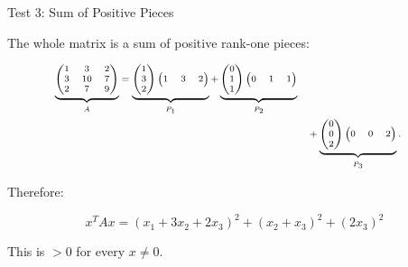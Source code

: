 \documentclass[10pt]{beamer}
\theoremstyle{definition}
\begin{document}
\begin{frame}{Test 3: Sum of Positive Pieces}

The whole matrix is a sum of positive rank-one pieces:

\[
\scriptsize
\begin{aligned}
\underbrace{
\begin{pmatrix}
1&3&2\\
3&10&7\\
2&7&9
\end{pmatrix}}_{A}
=
\underbrace{
\begin{pmatrix}1\\3\\2\end{pmatrix}
\begin{pmatrix}1&3&2\end{pmatrix}}_{P_1}
+
\underbrace{
\begin{pmatrix}0\\1\\1\end{pmatrix}
\begin{pmatrix}0&1&1\end{pmatrix}}_{P_2}
\\
&\quad+
\underbrace{
\begin{pmatrix}0\\0\\2\end{pmatrix}
\begin{pmatrix}0&0&2\end{pmatrix}}_{P_3}.
\end{aligned}
\]

\vfill

Therefore:

$$
x^TAx
=(x_1+3x_2+2x_3)^2+(x_2+x_3)^2+(2x_3)^2
$$

This is $>0$ for every $x\ne0$.

\end{frame}
\end{document}
